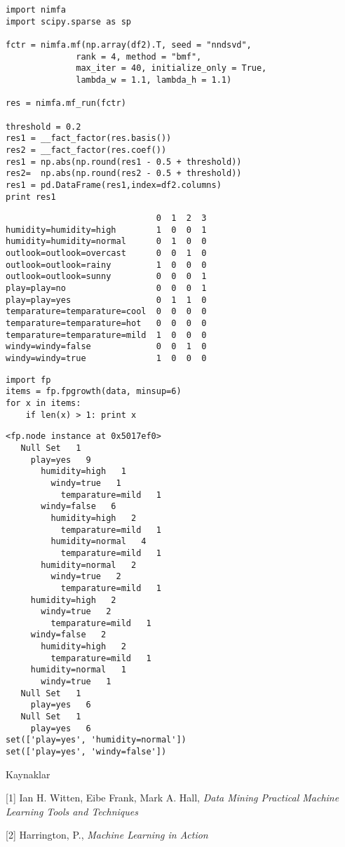 \documentclass[12pt,fleqn]{article}\usepackage{../common}
\begin{document}
\begin{verbatim}
import nimfa
import scipy.sparse as sp

fctr = nimfa.mf(np.array(df2).T, seed = "nndsvd", 
              rank = 4, method = "bmf", 
              max_iter = 40, initialize_only = True,
              lambda_w = 1.1, lambda_h = 1.1)

res = nimfa.mf_run(fctr)

threshold = 0.2
res1 = __fact_factor(res.basis())
res2 = __fact_factor(res.coef())
res1 = np.abs(np.round(res1 - 0.5 + threshold))
res2=  np.abs(np.round(res2 - 0.5 + threshold))
res1 = pd.DataFrame(res1,index=df2.columns)
print res1
\end{verbatim}

\begin{verbatim}
                              0  1  2  3
humidity=humidity=high        1  0  0  1
humidity=humidity=normal      0  1  0  0
outlook=outlook=overcast      0  0  1  0
outlook=outlook=rainy         1  0  0  0
outlook=outlook=sunny         0  0  0  1
play=play=no                  0  0  0  1
play=play=yes                 0  1  1  0
temparature=temparature=cool  0  0  0  0
temparature=temparature=hot   0  0  0  0
temparature=temparature=mild  1  0  0  0
windy=windy=false             0  0  1  0
windy=windy=true              1  0  0  0
\end{verbatim}

\begin{verbatim}
import fp
items = fp.fpgrowth(data, minsup=6)
for x in items:
    if len(x) > 1: print x
\end{verbatim}

\begin{verbatim}
<fp.node instance at 0x5017ef0>
   Null Set   1
     play=yes   9
       humidity=high   1
         windy=true   1
           temparature=mild   1
       windy=false   6
         humidity=high   2
           temparature=mild   1
         humidity=normal   4
           temparature=mild   1
       humidity=normal   2
         windy=true   2
           temparature=mild   1
     humidity=high   2
       windy=true   2
         temparature=mild   1
     windy=false   2
       humidity=high   2
         temparature=mild   1
     humidity=normal   1
       windy=true   1
   Null Set   1
     play=yes   6
   Null Set   1
     play=yes   6
set(['play=yes', 'humidity=normal'])
set(['play=yes', 'windy=false'])
\end{verbatim}

Kaynaklar

[1] Ian H. Witten, Eibe Frank, Mark A. Hall, {\em Data Mining Practical Machine Learning Tools and Techniques}

[2] Harrington, P., {\em Machine Learning in Action}
\end{document}
